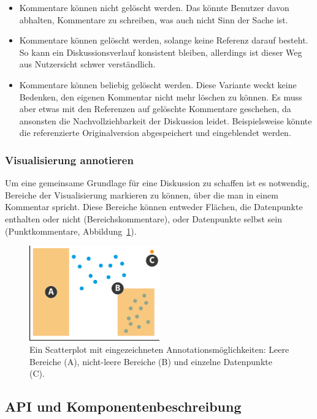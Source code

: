 \documentclass[
	headsepline,
	footsepline,
	fontsize=12pt,
	bibliography=totoc
]{scrbook}
\begin{document}
\begin{itemize}
	\item Kommentare können nicht gelöscht werden. Das könnte Benutzer davon abhalten, Kommentare zu schreiben, was auch nicht Sinn der Sache ist.
	\item Kommentare können gelöscht werden, solange keine Referenz darauf besteht. So kann ein Diskussionsverlauf konsistent bleiben, allerdings ist dieser Weg aus Nutzersicht schwer verständlich.
	\item Kommentare können beliebig gelöscht werden. Diese Variante weckt keine Bedenken, den eigenen Kommentar nicht mehr löschen zu können. Es muss aber etwas mit den Referenzen auf gelöschte Kommentare geschehen, da ansonsten die Nachvollziehbarkeit der Diskussion leidet. Beispielsweise könnte die referenzierte Originalversion abgespeichert und eingeblendet werden.
\end{itemize}

\subsubsection{Visualisierung annotieren}

Um eine gemeinsame Grundlage für eine Diskussion zu schaffen ist es notwendig, Bereiche der Visualisierung markieren zu können, über die man in einem Kommentar spricht. Diese Bereiche können entweder Flächen, die Datenpunkte enthalten oder nicht (Bereichskommentare), oder Datenpunkte selbst sein (Punktkommentare, Abbildung~\ref{figure:datenbereiche}).

\begin{figure}[htbp]
   \centering
   \includegraphics[width=0.5\textwidth]{images/konzeption-datenbereiche.png}
   \caption{Ein Scatterplot mit eingezeichneten Annotationsmöglichkeiten: Leere Bereiche (A), nicht-leere Bereiche (B) und einzelne Datenpunkte (C).}
   \label{figure:datenbereiche}
\end{figure}

\subsection{API und Komponentenbeschreibung}
\label{section:konzeption:kommentare:api}
\end{document}
